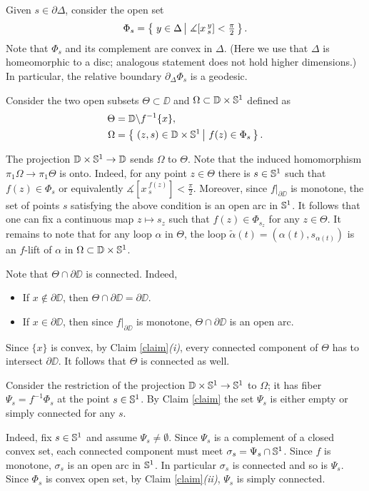 \documentclass{article}
\begin{document}
Given $s\in\partial \Delta$, consider the open set
\[\Phi_s=\set{y\in\Delta}{\measuredangle [x\,^y_s]<\tfrac\pi2}.\]
Note that $\Phi_s$ and its complement are convex in $\Delta$.
(Here we use that $\Delta$ is homeomorphic to a disc; analogous statement does not hold higher dimensions.)
In particular, the relative boundary $\partial_\Delta\Phi_s$ is a geodesic.

Consider the two open subsets $\Theta\subset \DD$ and $\Omega\subset  \mathbb{D}\times\mathbb{S}^1$ defined as
\begin{align*}
\Theta&=\DD\backslash f^{-1}\{x\},
\\
\Omega&=\set{(z,s)\in \DD\times\SS^1}{f(z)\in \Phi_s}.
\end{align*}

The  projection $\mathbb{D}\times\mathbb{S}^1\to \mathbb{D}$ sends $\Omega$ to $\Theta$.
Note that the induced homomorphism $\pi_1\Omega\to \pi_1\Theta$ is onto.
Indeed, for any point $z\in \Theta$ there is $s\in \mathbb{S}^1$ such that $f(z)\in \Phi_s$ or equivalently $\measuredangle [x\,^{f(z)}_s]<\tfrac\pi2$.
Moreover, since $f|_{\partial\DD}$ is monotone, the set of points $s$ satisfying the above condition is an open arc in $\mathbb{S}^1$.
It follows that one can fix a continuous map $z\mapsto s_z$ such that $f(z)\in \Phi_{s_z}$ for any $z\in \Theta$.
It remains to note that for any loop $\alpha$ in $\Theta$, the loop $\tilde\alpha(t)=(\alpha(t),s_{\alpha(t)})$ is an $f$-lift of $\alpha$ in $\Omega\subset\mathbb{D}\times\mathbb{S}^1$.

Note that $\Theta\cap \partial\DD$ is connected.
Indeed,
\begin{itemize}
\item If $x\notin \partial\DD$, then $\Theta\cap \partial\DD=\partial \DD$. 
\item If $x\in \partial\DD$, then since $f|_{\partial\DD}$ is monotone, $\Theta\cap \partial\DD$ is an open arc.
\end{itemize}
Since $\{x\}$ is convex, by Claim \ref{claim}\textit{(i)}, every connected component of $\Theta$ has to intersect $\partial\DD$.
It follows that $\Theta$ is connected as well.

Consider the restriction of the projection $\mathbb{D}\times\mathbb{S}^1\to \mathbb{S}^1$ to $\Omega$;
it has fiber $\Psi_s=f^{-1}\Phi_s$ at the point $s\in\mathbb{S}^1$.
By Claim \ref{claim} the set $\Psi_s$ is either empty or simply connected for any $s$.

Indeed, fix $s\in\mathbb{S}^1$ and assume $\Psi_s\ne \emptyset$.
Since $\Psi_s$ is a complement of a closed convex set,
each connected component must meet $\sigma_s=\Psi_s\cap\mathbb{S}^1$.
Since $f$ is monotone, $\sigma_s$ is an open arc in $\mathbb{S}^1$.
In particular $\sigma_s$ is connected and so is $\Psi_s$.
Since $\Phi_s$ is convex open set, by Claim \ref{claim}\textit{(ii)}, $\Psi_s$ is simply connected.
\end{document}
